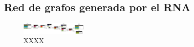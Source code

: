\subsection{Red de grafos generada por el RNA}

 \lipsum[1]

\begin{figure}[H]
	\centering
	\includegraphics[angle = 90, origin = c, width=0.29\textwidth]{Figuras/Graph_1}
	\centering\caption{XXXX}
\end{figure}

\lipsum[1]